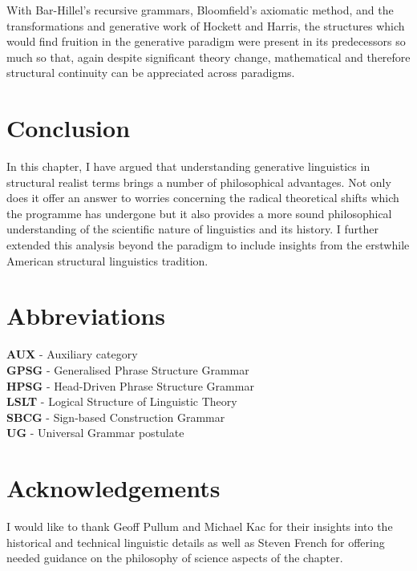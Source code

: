 \documentclass[output=paper]{langscibook}
\begin{document}
With Bar-Hillel's recursive grammars, Bloomfield's axiomatic method, and the transformations and generative work of Hockett and Harris, the structures which would find fruition in the generative paradigm were present in its predecessors so much so that, again despite significant theory change, mathematical and therefore structural continuity can be appreciated across paradigms. 

\section{Conclusion}
\label{sec:nefdt:conc}

In this chapter, I have argued that understanding generative linguistics in structural realist terms brings a number of philosophical advantages. Not only does it offer an answer to worries concerning the radical theoretical shifts which the programme has undergone but it also provides a more sound philosophical understanding of the scientific nature of linguistics and its history. I further extended this analysis beyond the paradigm to include insights from the erstwhile American structural linguistics tradition. 

\section*{Abbreviations}
\label{sec:nefdt:abbr}

\textbf{AUX} - Auxiliary category
\\\textbf{GPSG} - Generalised Phrase Structure Grammar
\\\textbf{HPSG} - Head-Driven Phrase Structure Grammar
\\\textbf{LSLT} - Logical Structure of Linguistic Theory
\\\textbf{SBCG} - Sign-based Construction Grammar
\\\textbf{UG} - Universal Grammar postulate

\section*{Acknowledgements}
\label{sec:nefdt:ackn}

 I would like to thank Geoff Pullum and Michael Kac for their insights into the historical and technical linguistic details as well as Steven French for offering needed guidance on the philosophy of science aspects of the chapter.


{\sloppy
\printbibliography[heading=subbibliography,notkeyword=this]
  
}
\end{document}
